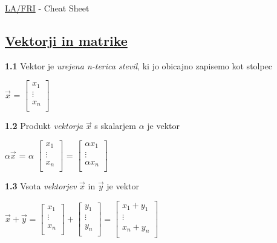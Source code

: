 \documentclass{article}
\begin{document}
\begin{center}
    {\huge \href{https://github.com/spagnoloG/LA-FRI}{LA/FRI} - Cheat Sheet \par}
\end{center}

\begin{multicols}{3}

\section{\underline{Vektorji in matrike}}

\textbf{1.1} Vektor je \textit{urejena n-terica stevil}, ki jo obicajno
zapisemo kot stolpec\smallskip
\begin{center}
    $\vec{x}$ =
    $\begin{bmatrix}
        x_{1}\\
        \vdots \\
        x_{n}\\
    \end{bmatrix}$
\end{center}

\textbf{1.2} Produkt \textit{vektorja} $\vec{x}$ s skalarjem $\alpha$ je vektor
\begin{center}
    $\alpha \vec{x}$ =
    $\alpha$
    $\begin{bmatrix}
        x_{1}\\
        \vdots \\
        x_{n}\\
    \end{bmatrix}$ =
    $\begin{bmatrix}
        \alpha x_{1}\\
        \vdots \\
        \alpha x_{n}\\
    \end{bmatrix}$
\end{center}

\textbf{1.3} Vsota \textit{vektorjev} $\vec{x}$ in $\vec{y}$ je vektor
\begin{center}
    $\vec{x} + \vec{y} = 
    \begin{bmatrix}
        x_{1}\\
        \vdots \\
        x_{n}\\
    \end{bmatrix} +
    \begin{bmatrix}
        y_{1}\\
        \vdots \\
        y_{n}\\
    \end{bmatrix} =
    \begin{bmatrix}
        x_{1}  +  y_{1}\\
        \vdots\\
        x_{n} + y_{n}\\
    \end{bmatrix} 
    $
\end{center}


\end{multicols}
\end{document}
